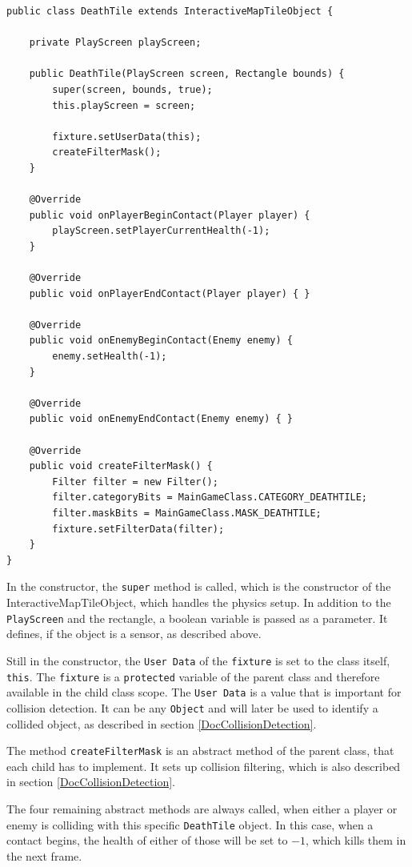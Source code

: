 \documentclass[12p]{article}
\begin{document}
\begin{verbatim}
public class DeathTile extends InteractiveMapTileObject {

    private PlayScreen playScreen;

    public DeathTile(PlayScreen screen, Rectangle bounds) {
        super(screen, bounds, true);
        this.playScreen = screen;

        fixture.setUserData(this);
        createFilterMask();
    }

    @Override
    public void onPlayerBeginContact(Player player) {
        playScreen.setPlayerCurrentHealth(-1);
    }

    @Override
    public void onPlayerEndContact(Player player) { }

    @Override
    public void onEnemyBeginContact(Enemy enemy) {
        enemy.setHealth(-1);
    }

    @Override
    public void onEnemyEndContact(Enemy enemy) { }

    @Override
    public void createFilterMask() {
        Filter filter = new Filter();
        filter.categoryBits = MainGameClass.CATEGORY_DEATHTILE;
        filter.maskBits = MainGameClass.MASK_DEATHTILE;
        fixture.setFilterData(filter);
    }
}
\end{verbatim}

In the constructor, the \texttt{super} method is called, which is the constructor of the InteractiveMapTileObject, which handles the physics setup. In addition to the \texttt{PlayScreen} and the rectangle, a boolean variable is passed as a parameter. It defines, if the object is a sensor, as described above.

Still in the constructor, the \texttt{User Data} of the \texttt{fixture} is set to the class itself, \texttt{this}. The \texttt{fixture} is a \texttt{protected} variable of the parent class and therefore available in the child class scope. The \texttt{User Data} is a value that is important for collision detection. It can be any \texttt{Object} and will later be used to identify a collided object, as described in section \ref{DocCollisionDetection}.

The method \texttt{createFilterMask} is an abstract method of the parent class, that each child has to implement. It sets up collision filtering, which is also described in section \ref{DocCollisionDetection}.

The four remaining abstract methods are always called, when either a player or enemy is colliding with this specific \texttt{DeathTile} object. In this case, when a contact begins, the health of either of those will be set to $-1$, which kills them in the next frame.
\end{document}
